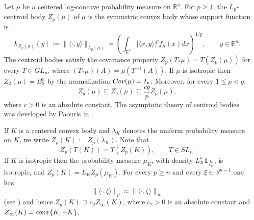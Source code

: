 \documentclass[10pt,a4paper]{amsart}
\numberwithin{equation}{section}
\newcommand{\ls}{\leqslant}
\newcommand{\gr}{\geqslant}
\begin{document}
Let $\mu$ be a centered log-concave probability measure on $\mathbb{R}^n$. For $p\gr 1$, the
$L_p$-centroid body $Z_p(\mu)$ of $\mu $ is the symmetric convex body whose support function is
\begin{equation*} h_{Z_p(\mu)}(y):=\|\langle \cdot ,y\rangle\|_{L_p(\mu)}=\left(
\int_{\mathbb{R}^n} |\langle x,y\rangle|^p f_{\mu}(x)dx \right)^{1/p},\qquad y\in \mathbb{R}^n.
\end{equation*} The centroid bodies satisfy the covariance property $Z_p(T_{\ast}\mu)=T(Z_p(\mu ))$ for every $T\in GL_n$,
where $(T_{\ast}\mu)(A)=\mu(T^{-1}(A))$. If $\mu$ is isotropic then $Z_2(\mu)=B_2^n$ by the normalization ${\rm Cov}(\mu)=I_n$. Moreover, for every $1\ls p<q$,
\begin{equation}\label{eq:zq-mu-inclusions}Z_p(\mu)\subseteq Z_q(\mu)\subseteq \frac{cq}{p}Z_p(\mu),
\end{equation}
where $c>0$ is an absolute constant. The asymptotic theory of centroid bodies was developed by Paouris in
\cite{Paouris-GAFA,Paouris-TAMS}.

If $K$ is a centered convex body and $\lambda_K$ denotes the uniform probability measure on $K$, we write
$Z_p(K):=Z_p(\lambda_K)$. Note that
\[Z_p(T(K))=T(Z_p(K)),\qquad T\in SL_n.\]
If $K$ is isotropic then the probability measure $\mu_K$, with density $L_K^n\mathds{1}_{\frac{K}{L_K}}$, is 
isotropic, and $Z_p(K)=L_KZ_p(\mu_K)$. For every $p\gr n$ and every $\xi\in S^{n-1}$ one has 
\begin{equation}\label{eq:stable}\|\langle \cdot,\xi\rangle\|_p\approx \|\langle \cdot,\xi\rangle\|_{\infty}\end{equation} 
(see \cite[Lemma~3.2.8/Proposition~5.1.2]{BGVV-book}) and hence $Z_p(K)\supseteq c_2Z_{\infty }(K)$, where $c_2>0$ is an absolute constant and 
$Z_{\infty}(K)={\rm conv}\{K,-K\}$. 
\end{document}
